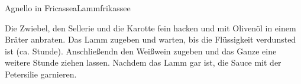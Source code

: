 \begin{recipe}{Agnello in Fricassea}{Lammfrikassee}
  \inglist

  \steps
  Die Zwiebel, den Sellerie und die Karotte fein hacken und mit Olivenöl in einem Bräter
  anbraten. Das Lamm zugeben und warten, bis die Flüssigkeit verdunsted ist (ca. \halb
  Stunde). Anschließendn den Weißwein zugeben und das Ganze eine weitere Stunde ziehen
  lassen. Nachdem das Lamm gar ist, die Sauce mit der Petersilie garnieren.
\end{recipe}
